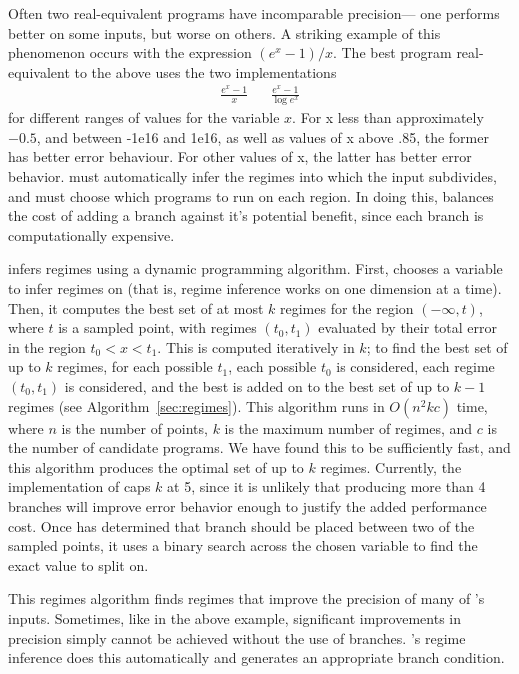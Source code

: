 \documentclass[paper.tex]{subfiles}
\begin{document}
Often two real-equivalent programs have incomparable precision---%
  one performs better on some inputs, but worse on others.
A striking example of this phenomenon occurs with the expression $(e^x - 1) / x$.
The best program real-equivalent to the above
  uses the two implementations
\begin{align*}
  \frac{e^x - 1}{x} && \frac{e^x - 1}{\log e^x}
\end{align*}
  for different ranges of values for the variable $x$.
For x less than approximately $-0.5$, 
  and between -1e16 and 1e16,
  as well as values of x above .85,
  the former has better error behaviour.
For other values of x,
  the latter has better error behavior.
\casio must automatically infer the regimes
  into which the input subdivides,
  and must choose which programs to run on each region.
In doing this, \casio balances the cost of adding a branch
  against it's potential benefit,
  since each branch is computationally expensive.

\casio infers regimes using a dynamic programming algorithm.
First, \casio chooses a variable to infer regimes on
  (that is, regime inference works on one dimension at a time).
Then, it computes the best set of at most $k$ regimes
  for the region $(-\infty, t)$, where $t$ is a sampled point,
  with regimes $(t_0, t_1)$ evaluated by their total error
  in the region $t_0 < x < t_1$.
This is computed iteratively in $k$;
  to find the best set of up to $k$ regimes,
  for each possible $t_1$, each possible $t_0$ is considered,
  each regime $(t_0, t_1)$ is considered,
  and the best is added on to the best set of up to $k-1$ regimes
  (see Algorithm~\ref{sec:regimes}).
This algorithm runs in $O(n^2 k c)$ time,
  where $n$ is the number of points,
  $k$ is the maximum number of regimes,
  and $c$ is the number of candidate programs.
We have found this to be sufficiently fast,
  and this algorithm produces the optimal set of up to $k$ regimes.
Currently, the implementation of \casio caps $k$ at 5,
  since it is unlikely that producing more than 4 branches
  will improve error behavior enough to justify the added performance cost.
Once \casio has determined that branch should be placed
  between two of the sampled points,
  it uses a binary search across the chosen variable to 
  find the exact value to split on.

This regimes algorithm finds regimes that improve
  the precision of many of \casio's inputs.
Sometimes, like in the above example,
  significant improvements in precision simply cannot be achieved
  without the use of branches.
\casio's regime inference does this automatically
  and generates an appropriate branch condition.
\end{document}
